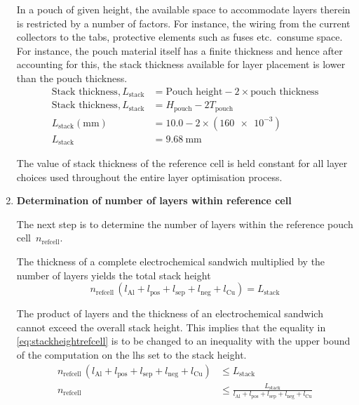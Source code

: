 \begin{enumerate}[ label=\textbf{\arabic*}), leftmargin=0pt, itemindent=20pt, labelwidth=15pt, labelsep=5pt, listparindent=0.7cm, align=left]
        In a  pouch of given height,  the available space to  accommodate layers
        therein is restricted  by a number of factors. For  instance, the wiring
        from the  current collectors  to the tabs,  protective elements  such as
        fuses etc.\ consume space. For instance, the pouch material itself has a
        finite  thickness  and  hence  after  accounting  for  this,  the  stack
        thickness  available  for  layer  placement  is  lower  than  the  pouch
        thickness.
        \begin{align}
            \text{Stack thickness}, L_\text{stack} & = \text{Pouch height} - 2\times \text{pouch thickness} \\
            \text{Stack thickness}, L_\text{stack} & = H_\text{pouch} - 2 T_\text{pouch} \\
            L_\text{stack}(\si{\milli\meter})      & = 10.0 - 2\times(\num{160e-3}) \\
            L_\text{stack}                         & = \SI{9.68}{\milli\meter}
        \end{align}

        The value of stack thickness of  the reference cell is held constant for
        all layer choices used throughout the entire layer optimisation process.

    \item \textbf{Determination of number  of layers within  reference cell}

        The  next  step  is  to  determine  the  number  of  layers  within  the
        reference pouch  cell~$n_\text{refcell}$.

        The thickness of a complete electrochemical sandwich multiplied by the
        number of layers yields the total stack height
        \begin{equation}\label{eq:stackheightrefcell}
            n_\text{refcell}\, (l_\text{Al} + l_\text{pos} + l_\text{sep} + l_\text{neg} + l_\text{Cu}) = L_\text{stack}
        \end{equation}

        The product of  layers and the thickness of  an electrochemical sandwich
        cannot exceed the  overall stack height. This implies  that the equality
        in \cref{eq:stackheightrefcell} is  to be changed to  an inequality with
        the upper  bound of the  computation on the  \gls{lhs} set to  the stack
        height.
        \begin{align}
            n_\text{refcell}\, (l_\text{Al} + l_\text{pos} + l_\text{sep} + l_\text{neg} + l_\text{Cu}) & \le L_\text{stack} \\
            n_\text{refcell}                                                                            & \le \frac{L_\text{stack}}{l_\text{Al} + l_\text{pos} + l_\text{sep} + l_\text{neg} + l_\text{Cu}}\label{eq:stackheightrefcellmod}
        \end{align}


\end{enumerate}
